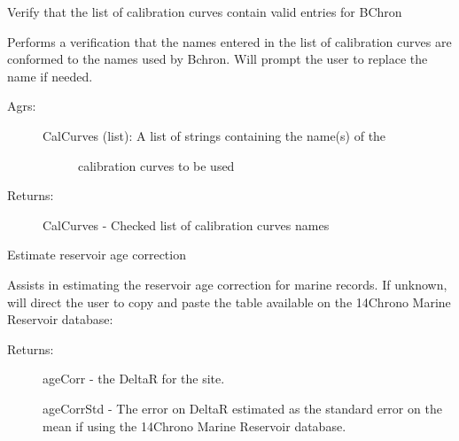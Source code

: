 \documentclass[letterpaper,10pt,english]{sphinxmanual}
\begin{document}
\begin{fulllineitems}
\label{\detokenize{RBchron:pyleoclim.RBchron.verifyCalCurves}}
Verify that the list of calibration curves contain valid entries for BChron

Performs a verification that the names entered in the list of calibration
curves are conformed to the names used by Bchron. Will prompt the user to
replace the name if needed.
\begin{description}
\item[{Agrs:}] \leavevmode\begin{description}
\item[{CalCurves (list): A list of strings containing the name(s) of the}] \leavevmode
calibration curves to be used

\end{description}

\item[{Returns:}] \leavevmode
CalCurves - Checked list of calibration curves names

\end{description}

\end{fulllineitems}


\begin{fulllineitems}
\label{\detokenize{RBchron:pyleoclim.RBchron.reservoirAgeCorrection}}
Estimate reservoir age correction

Assists in estimating the reservoir age correction for marine records.
If unknown, will direct the user to copy and paste the table available
on the 14Chrono Marine Reservoir database: 
\begin{description}
\item[{Returns:}] \leavevmode
ageCorr -  the DeltaR for the site.

ageCorrStd - The error on DeltaR estimated as the standard error on the 
mean if using the 14Chrono Marine Reservoir database.

\end{description}

\end{fulllineitems}
\end{document}
